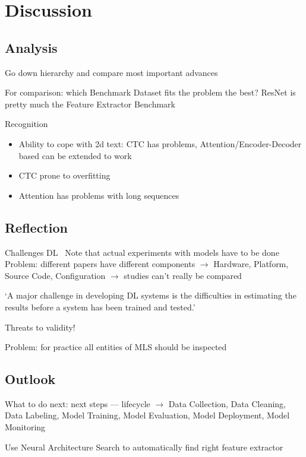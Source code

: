 \chapter{Discussion}\label{ch:discussion}
\section{Analysis}
Go down hierarchy and compare most important advances

For comparison: which Benchmark Dataset fits the problem the best?
ResNet is pretty much the Feature Extractor Benchmark

Recognition
\begin{itemize}
    \item Ability to cope with 2d text:
        CTC has problems,
        Attention/Encoder-Decoder based can be extended to work
    \item CTC prone to overfitting
    \item Attention has problems with long sequences
\end{itemize}


\section{Reflection}
Challenges DL~\citep{arpteg_software_2018}
Note that actual experiments with models have to be done
Problem: different papers have different components
$\rightarrow$ Hardware, Platform, Source Code, Configuration
$\rightarrow$ studies can't really be compared

`A major challenge in developing DL systems is the difficulties in estimating
the results before a system has been trained and tested.'~\citep{arpteg_software_2018}

Threats to validity!

Problem: for practice all entities of \ac{MLS} should be inspected

\section{Outlook}

What to do next: next steps --- lifecycle
$\rightarrow$
Data Collection, Data Cleaning, Data Labeling, Model Training, Model Evaluation, Model Deployment,
Model Monitoring~\cite{watanabe_preliminary_2019}

Use Neural Architecture Search to automatically find right feature extractor

